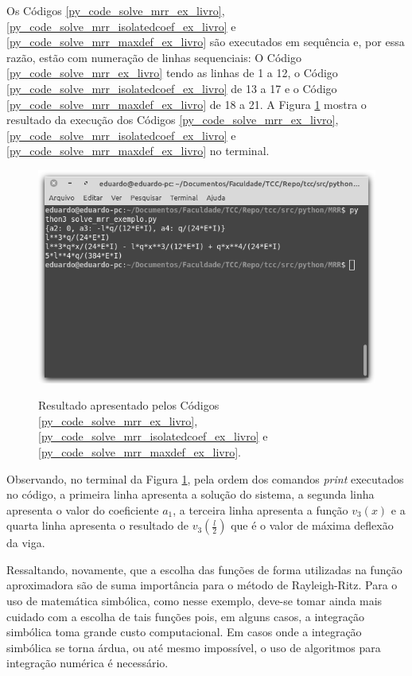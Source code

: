 \documentclass[
	12pt,				%
	openright,			%
    twoside,			%
	a4paper,			%
	english,			%
	french,				%
	spanish,			%
	brazil				%
	]{abntex2}
\numberwithin{lema}{chapter}
\numberwithin{teorema}{chapter}
\numberwithin{definicao}{chapter}
\numberwithin{exemplo}{chapter}
\numberwithin{figure}{chapter}
\begin{document}
Os Códigos \ref{py_code_solve_mrr_ex_livro}, \ref{py_code_solve_mrr_isolatedcoef_ex_livro} e \ref{py_code_solve_mrr_maxdef_ex_livro} são executados em sequência e, por essa razão, estão com numeração de linhas sequenciais: O Código \ref{py_code_solve_mrr_ex_livro} tendo as linhas de 1 a 12, o Código \ref{py_code_solve_mrr_isolatedcoef_ex_livro} de 13 a 17 e o Código \ref{py_code_solve_mrr_maxdef_ex_livro} de 18 a 21. A Figura \ref{fig:code_solve_mrr_exec_complete} mostra o resultado da execução dos Códigos \ref{py_code_solve_mrr_ex_livro}, \ref{py_code_solve_mrr_isolatedcoef_ex_livro} e \ref{py_code_solve_mrr_maxdef_ex_livro} no terminal.

\begin{figure}[h]
	\caption{Resultado apresentado pelos Códigos \ref{py_code_solve_mrr_ex_livro}, \ref{py_code_solve_mrr_isolatedcoef_ex_livro} e \ref{py_code_solve_mrr_maxdef_ex_livro}.}
	\centering
	\includegraphics[scale=2.5]{../figuras/code/code_solve_mrr_exec_complete.png}
	\label{fig:code_solve_mrr_exec_complete}
\end{figure}

Observando, no terminal da Figura \ref{fig:code_solve_mrr_exec_complete}, pela ordem dos comandos \textit{print} executados no código, a primeira linha apresenta a solução do sistema, a segunda linha apresenta o valor do coeficiente $a_1$, a terceira linha apresenta a função $v_3(x)$ e a quarta linha apresenta o resultado de $v_3(\frac{l}{2})$ que é o valor de máxima deflexão da viga.

Ressaltando, novamente, que a escolha das funções de forma utilizadas na função aproximadora são de suma importância para o método de Rayleigh-Ritz. Para o uso de matemática simbólica, como nesse exemplo, deve-se tomar ainda mais cuidado com a escolha de tais funções pois, em alguns casos, a integração simbólica toma grande custo computacional. Em casos onde a integração simbólica se torna árdua, ou até mesmo impossível, o uso de algoritmos para integração numérica é necessário.
\end{document}
